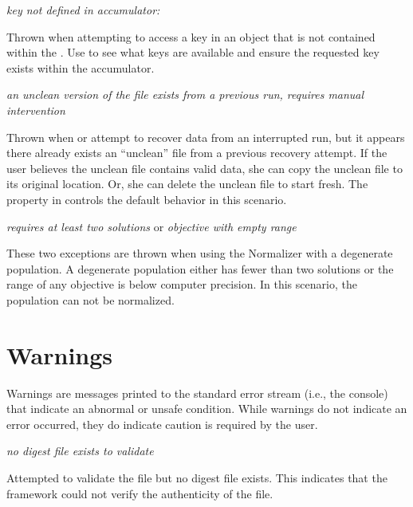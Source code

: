 \noindent
\textit{key not defined in accumulator: }
\begin{indented}
  Thrown when attempting to access a key in an  object that is not contained within the .  Use  to see what keys are available and ensure the requested key exists within the accumulator.
\end{indented}

\noindent
\textit{an unclean version of the file exists from a previous run, requires manual intervention}
\begin{indented}
  Thrown when  or  attempt to recover data from an interrupted run, but it appears there already exists an ``unclean'' file from a previous recovery attempt.  If the user believes the unclean file contains valid data, she can copy the unclean file to its original location.  Or, she can delete the unclean file to start fresh.  The  property in  controls the default behavior in this scenario.
\end{indented}

\noindent
\textit{requires at least two solutions} or
\textit{objective with empty range}
\begin{indented}
  These two exceptions are thrown when using the Normalizer with a degenerate population.  A degenerate population either has fewer than two solutions or the range of any objective is below computer precision.  In this scenario, the population can not be normalized.
\end{indented}





\section{Warnings}
Warnings are messages printed to the standard error stream (i.e., the console) that indicate an abnormal or unsafe condition.  While warnings do not indicate an error occurred, they do indicate caution is required by the user.
\vspace{\baselineskip}

\noindent
\textit{no digest file exists to validate }
\begin{indented}
  Attempted to validate the file but no digest file exists.  This indicates that the framework could not verify the authenticity of the file.
\end{indented}
  
